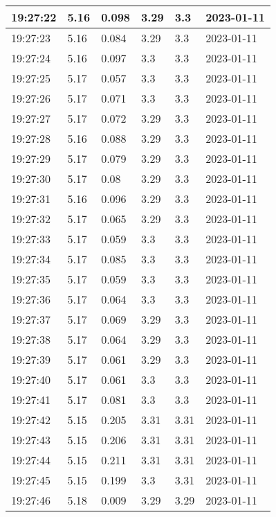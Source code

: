 \begin{longtable}{|l|l|l|l|l|l|}
        19:27:22 & 5.16 & 0.098 & 3.29 & 3.3 & 2023-01-11 \\ \hline
        19:27:23 & 5.16 & 0.084 & 3.29 & 3.3 & 2023-01-11 \\ \hline
        19:27:24 & 5.16 & 0.097 & 3.3 & 3.3 & 2023-01-11 \\ \hline
        19:27:25 & 5.17 & 0.057 & 3.3 & 3.3 & 2023-01-11 \\ \hline
        19:27:26 & 5.17 & 0.071 & 3.3 & 3.3 & 2023-01-11 \\ \hline
        19:27:27 & 5.17 & 0.072 & 3.29 & 3.3 & 2023-01-11 \\ \hline
        19:27:28 & 5.16 & 0.088 & 3.29 & 3.3 & 2023-01-11 \\ \hline
        19:27:29 & 5.17 & 0.079 & 3.29 & 3.3 & 2023-01-11 \\ \hline
        19:27:30 & 5.17 & 0.08 & 3.29 & 3.3 & 2023-01-11 \\ \hline
        19:27:31 & 5.16 & 0.096 & 3.29 & 3.3 & 2023-01-11 \\ \hline
        19:27:32 & 5.17 & 0.065 & 3.29 & 3.3 & 2023-01-11 \\ \hline
        19:27:33 & 5.17 & 0.059 & 3.3 & 3.3 & 2023-01-11 \\ \hline
        19:27:34 & 5.17 & 0.085 & 3.3 & 3.3 & 2023-01-11 \\ \hline
        19:27:35 & 5.17 & 0.059 & 3.3 & 3.3 & 2023-01-11 \\ \hline
        19:27:36 & 5.17 & 0.064 & 3.3 & 3.3 & 2023-01-11 \\ \hline
        19:27:37 & 5.17 & 0.069 & 3.29 & 3.3 & 2023-01-11 \\ \hline
        19:27:38 & 5.17 & 0.064 & 3.29 & 3.3 & 2023-01-11 \\ \hline
        19:27:39 & 5.17 & 0.061 & 3.29 & 3.3 & 2023-01-11 \\ \hline
        19:27:40 & 5.17 & 0.061 & 3.3 & 3.3 & 2023-01-11 \\ \hline
        19:27:41 & 5.17 & 0.081 & 3.3 & 3.3 & 2023-01-11 \\ \hline
        19:27:42 & 5.15 & 0.205 & 3.31 & 3.31 & 2023-01-11 \\ \hline
        19:27:43 & 5.15 & 0.206 & 3.31 & 3.31 & 2023-01-11 \\ \hline
        19:27:44 & 5.15 & 0.211 & 3.31 & 3.31 & 2023-01-11 \\ \hline
        19:27:45 & 5.15 & 0.199 & 3.3 & 3.31 & 2023-01-11 \\ \hline
        19:27:46 & 5.18 & 0.009 & 3.29 & 3.29 & 2023-01-11 \\ \hline

\end{longtable}
